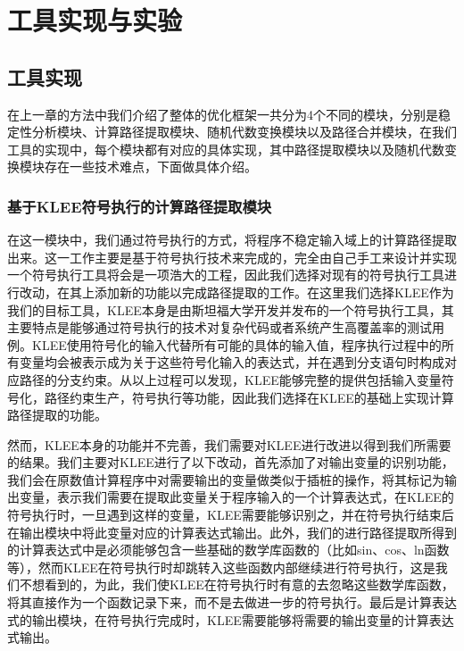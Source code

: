 \chapter{工具实现与实验}\label{chapter_experiment}

\section{工具实现}

在上一章的方法中我们介绍了整体的优化框架一共分为4个不同的模块，分别是稳定性分析模块、计算路径提取模块、随机代数变换模块以及路径合并模块，在我们工具的实现中，每个模块都有对应的具体实现，其中路径提取模块以及随机代数变换模块存在一些技术难点，下面做具体介绍。

\subsection{基于KLEE符号执行的计算路径提取模块}

在这一模块中，我们通过符号执行的方式，将程序不稳定输入域上的计算路径提取出来。这一工作主要是基于符号执行技术来完成的，完全由自己手工来设计并实现一个符号执行工具将会是一项浩大的工程，因此我们选择对现有的符号执行工具进行改动，在其上添加新的功能以完成路径提取的工作。在这里我们选择KLEE\cite{Cadar:2008:KUA:1855741.1855756}作为我们的目标工具，KLEE本身是由斯坦福大学开发并发布的一个符号执行工具，其主要特点是能够通过符号执行的技术对复杂代码或者系统产生高覆盖率的测试用例。KLEE使用符号化的输入代替所有可能的具体的输入值，程序执行过程中的所有变量均会被表示成为关于这些符号化输入的表达式，并在遇到分支语句时构成对应路径的分支约束。从以上过程可以发现，KLEE能够完整的提供包括输入变量符号化，路径约束生产，符号执行等功能，因此我们选择在KLEE的基础上实现计算路径提取的功能。

然而，KLEE本身的功能并不完善，我们需要对KLEE进行改进以得到我们所需要的结果。我们主要对KLEE进行了以下改动，首先添加了对输出变量的识别功能，我们会在原数值计算程序中对需要输出的变量做类似于插桩的操作，将其标记为输出变量，表示我们需要在提取此变量关于程序输入的一个计算表达式，在KLEE的符号执行时，一旦遇到这样的变量，KLEE需要能够识别之，并在符号执行结束后在输出模块中将此变量对应的计算表达式输出。此外，我们的进行路径提取所得到的计算表达式中是必须能够包含一些基础的数学库函数的（比如sin、cos、ln函数等），然而KLEE在符号执行时却跳转入这些函数内部继续进行符号执行，这是我们不想看到的，为此，我们使KLEE在符号执行时有意的去忽略这些数学库函数，将其直接作为一个函数记录下来，而不是去做进一步的符号执行。最后是计算表达式的输出模块，在符号执行完成时，KLEE需要能够将需要的输出变量的计算表达式输出。

